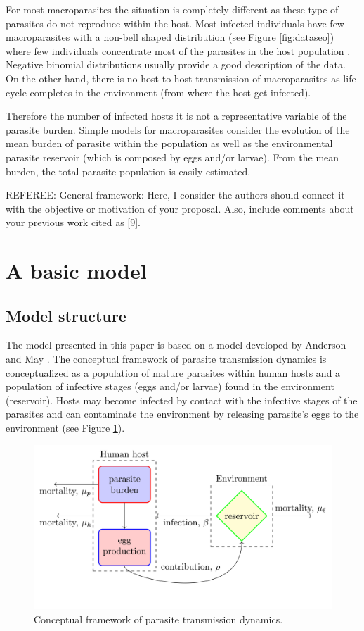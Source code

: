 \documentclass[eng]{MMSB-class-eng}
\begin{document}
For most macroparasites the situation is completely different as these type of parasites do not reproduce within the host.  Most  infected  individuals have few macroparasites with a non-bell shaped distribution (see Figure \ref{fig:dataseo}) where few individuals concentrate most of the parasites in the host population \citep{seo1979frequency,lopez2022simple}. Negative binomial distributions usually provide a good description of the data. On the other hand, there is no host-to-host transmission of macroparasites as life cycle completes in the environment (from where the host get infected).  


Therefore the number of infected hosts it is not a representative variable of the parasite burden. Simple models for macroparasites consider the evolution of the mean burden of parasite within the population as well as the environmental parasite reservoir (which is composed by eggs and/or larvae). From the mean burden, the total parasite population is easily estimated. 

{\color{blue}REFEREE: General framework: Here, I consider the authors should connect it with the
	objective or motivation of your proposal. Also, include comments about your
	previous work cited as [9].}

\section{A basic model}
\label{s:basicmodel}

\subsection{Model structure}
\label{ss:structure}
The model presented in this paper is based on a model developed by Anderson and May \citep{anderson1992infectious,anderson1985helminth}.
The conceptual framework of parasite transmission dynamics is conceptualized as a population of mature parasites within human hosts and a population of infective stages (eggs and/or larvae) found in the environment (reservoir).
Hosts may become infected by contact with the infective stages of the parasites 
and can contaminate the environment by releasing parasite's eggs to the environment (see Figure \ref{f:diagram}). 
\begin{figure}[h!]
	\centering
	\includegraphics[width=0.99\linewidth]{diagram}
	\caption{Conceptual framework of parasite transmission dynamics.}
	\label{f:diagram}
\end{figure}
\end{document}
